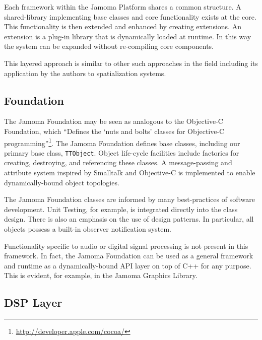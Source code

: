 \documentclass[twoside,10pt]{article}
\begin{document}
Each framework within the Jamoma Platform shares a common structure.  A shared-library implementing base classes and core functionality exists at the core.  This functionality is then extended and enhanced by creating extensions.  An extension is a plug-in library that is dynamically loaded at runtime.  In this way the system can be expanded without re-compiling core components.


This layered approach is similar to other such approaches in the field including its application by the authors to spatialization systems\cite{Peters:2009}.


\subsection{Foundation} %

The Jamoma Foundation may be seen as analogous to the Objective-C Foundation, which ``Defines the `nuts and bolts' classes for Objective-C programming''\footnote{\url{http://developer.apple.com/cocoa/}}.  The Jamoma Foundation defines base classes, including our primary base class, \texttt{TTObject}.  Object life-cycle facilities include factories for creating, destroying, and referencing these classes.  A message-passing and attribute system inspired by Smalltalk\cite{Krasner:1988} and Objective-C\cite{Cox:1986} is implemented to enable dynamically-bound object topologies.  

The Jamoma Foundation classes are informed by many best-practices of software development.  Unit Testing, for example, is integrated directly into the class design.  There is also an emphasis on the use of design patterns\cite{Gamma:1995}.  In particular, all objects possess a built-in observer notification system.

Functionality specific to audio or digital signal processing is not present in this framework.  In fact, the Jamoma Foundation can be used as a general framework and runtime as a dynamically-bound API layer on top of C++ for any purpose.  This is evident, for example, in the Jamoma Graphics Library.




\subsection{DSP Layer} %
\end{document}
